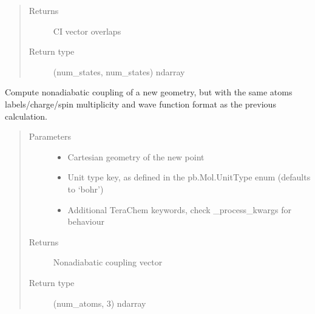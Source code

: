 \documentclass[letterpaper,10pt,english]{sphinxmanual}
\begin{document}
\begin{fulllineitems}
\begin{fulllineitems}
\begin{quote}
\begin{description}
\begin{itemize}
\end{itemize}

\item[{Returns}] \leavevmode
CI vector overlaps

\item[{Return type}] \leavevmode
(num\_states, num\_states) ndarray

\end{description}\end{quote}

\end{fulllineitems}


\begin{fulllineitems}
\label{\detokenize{tcpb:tcpb.tcpb.TCProtobufClient.compute_coupling}}
Compute nonadiabatic coupling of a new geometry, but with the same atoms labels/charge/spin
multiplicity and wave function format as the previous calculation.
\begin{quote}\begin{description}
\item[{Parameters}] \leavevmode\begin{itemize}
\item {} 
 \textendash{} Cartesian geometry of the new point

\item {} 
 \textendash{} Unit type key, as defined in the pb.Mol.UnitType enum (defaults to ‘bohr’)

\item {} 
 \textendash{} Additional TeraChem keywords, check \_process\_kwargs for behaviour

\end{itemize}

\item[{Returns}] \leavevmode
Nonadiabatic coupling vector

\item[{Return type}] \leavevmode
(num\_atoms, 3) ndarray

\end{description}\end{quote}

\end{fulllineitems}


\end{fulllineitems}
\end{document}
